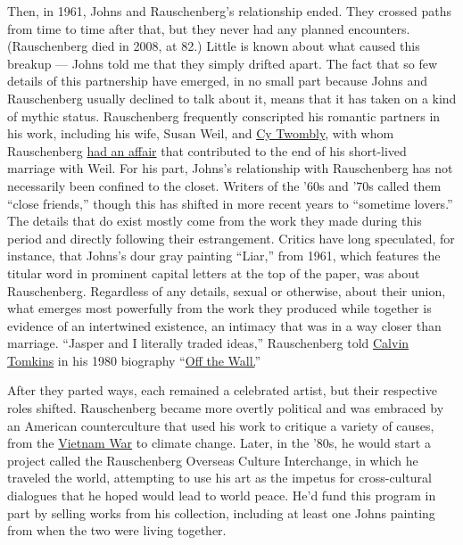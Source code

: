 Then, in 1961, Johns and Rauschenberg's relationship ended. They crossed
paths from time to time after that, but they never had any planned
encounters. (Rauschenberg died in 2008, at 82.) Little is known about
what caused this breakup --- Johns told me that they simply drifted
apart. The fact that so few details of this partnership have emerged, in
no small part because Johns and Rauschenberg usually declined to talk
about it, means that it has taken on a kind of mythic status.
Rauschenberg frequently conscripted his romantic partners in his work,
including his wife, Susan Weil, and
\href{https://www.nytimes.com/2011/07/06/arts/cy-twombly-american-artist-is-dead-at-83.html}{Cy
Twombly}, with whom Rauschenberg
\href{https://www.nytimes.com/2018/10/11/t-magazine/cy-twombly-robert-rauschenberg-art-travel.html}{had
an affair} that contributed to the end of his short-lived marriage with
Weil. For his part, Johns's relationship with Rauschenberg has not
necessarily been confined to the closet. Writers of the '60s and '70s
called them ``close friends,'' though this has shifted in more recent
years to ``sometime lovers.'' The details that do exist mostly come from
the work they made during this period and directly following their
estrangement. Critics have long speculated, for instance, that Johns's
dour gray painting ``Liar,'' from 1961, which features the titular word
in prominent capital letters at the top of the paper, was about
Rauschenberg. Regardless of any details, sexual or otherwise, about
their union, what emerges most powerfully from the work they produced
while together is evidence of an intertwined existence, an intimacy that
was in a way closer than marriage. ``Jasper and I literally traded
ideas,'' Rauschenberg told
\href{https://www.nytimes.com/2011/10/05/arts/calvin-tomkins-continues-to-chronicle-artists.html}{Calvin
Tomkins} in his 1980 biography
``\href{https://us.macmillan.com/books/9780312425852}{Off the Wall.}''

After they parted ways, each remained a celebrated artist, but their
respective roles shifted. Rauschenberg became more overtly political and
was embraced by an American counterculture that used his work to
critique a variety of causes, from the
\href{https://www.nytimes.com/topic/subject/vietnam-war}{Vietnam War} to
climate change. Later, in the '80s, he would start a project called the
Rauschenberg Overseas Culture Interchange, in which he traveled the
world, attempting to use his art as the impetus for cross-cultural
dialogues that he hoped would lead to world peace. He'd fund this
program in part by selling works from his collection, including at least
one Johns painting from when the two were living together.

